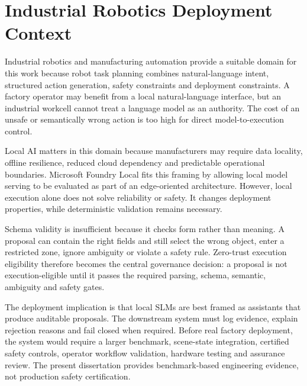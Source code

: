 \section{Industrial Robotics Deployment Context}
\label{sec:industrial_robotics_context}

Industrial robotics and manufacturing automation provide a suitable domain for this work because robot task planning combines natural-language intent, structured action generation, safety constraints and deployment constraints. A factory operator may benefit from a local natural-language interface, but an industrial workcell cannot treat a language model as an authority. The cost of an unsafe or semantically wrong action is too high for direct model-to-execution control.

Local AI matters in this domain because manufacturers may require data locality, offline resilience, reduced cloud dependency and predictable operational boundaries. Microsoft Foundry Local fits this framing by allowing local model serving to be evaluated as part of an edge-oriented architecture. However, local execution alone does not solve reliability or safety. It changes deployment properties, while deterministic validation remains necessary.

Schema validity is insufficient because it checks form rather than meaning. A proposal can contain the right fields and still select the wrong object, enter a restricted zone, ignore ambiguity or violate a safety rule. Zero-trust execution eligibility therefore becomes the central governance decision: a proposal is not execution-eligible until it passes the required parsing, schema, semantic, ambiguity and safety gates.

The deployment implication is that local SLMs are best framed as assistants that produce auditable proposals. The downstream system must log evidence, explain rejection reasons and fail closed when required. Before real factory deployment, the system would require a larger benchmark, scene-state integration, certified safety controls, operator workflow validation, hardware testing and assurance review. The present dissertation provides benchmark-based engineering evidence, not production safety certification.
